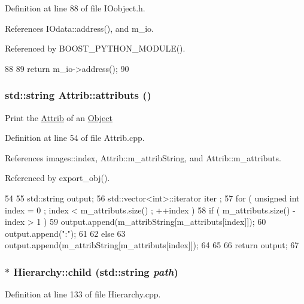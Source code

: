 Definition at line 88 of file IOobject.h.

References IOdata::address(), and m\_\-io.

Referenced by BOOST\_\-PYTHON\_\-MODULE().


\begin{DoxyCode}
88                {
89     return m_io->address();
90   }
\end{DoxyCode}
\hypertarget{classAttrib_aee7bbf16b144887f196e1341b24f8a26}{
\subsubsection[{attributs}]{\setlength{\rightskip}{0pt plus 5cm}std::string Attrib::attributs ()}}
\label{classAttrib_aee7bbf16b144887f196e1341b24f8a26}
Print the \hyperlink{classAttrib}{Attrib} of an \hyperlink{classObject}{Object} 

Definition at line 54 of file Attrib.cpp.

References images::index, Attrib::m\_\-attribString, and Attrib::m\_\-attributs.

Referenced by export\_\-obj().


\begin{DoxyCode}
54                             {
55   std::string output;
56   std::vector<int>::iterator iter ;
57   for ( unsigned int index = 0 ; index < m_attributs.size() ; ++index ) {
58     if ( m_attributs.size() - index > 1 ) {
59       output.append(m_attribString[m_attributs[index]]);
60       output.append(":");
61     }
62     else {
63       output.append(m_attribString[m_attributs[index]]);
64     }
65   }
66   return output;
67 }
\end{DoxyCode}
\hypertarget{classHierarchy_a1e207f973c694b538bf90107b4868817}{
\subsubsection[{child}]{ $\ast$ Hierarchy::child (std::string {\em path})}}
\label{classHierarchy_a1e207f973c694b538bf90107b4868817}


Definition at line 133 of file Hierarchy.cpp.

